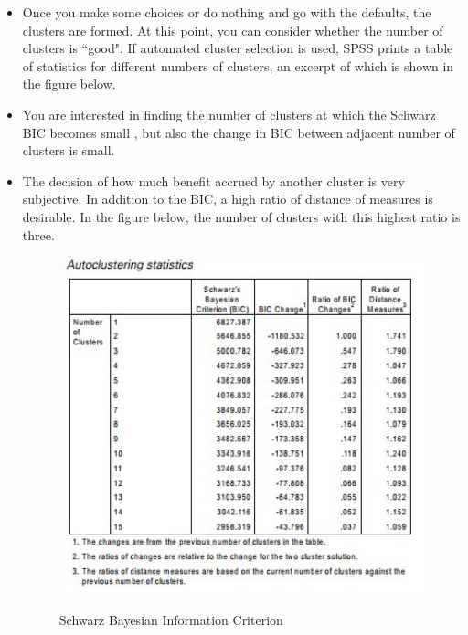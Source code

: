 \documentclass[a4paper,12pt]{article}
\begin{document}
\begin{itemize}
	\item Once you make some choices or do nothing and go with the defaults, the clusters are
	formed. At this point, you can consider whether the number of clusters is ``good". If
	automated cluster selection is used, SPSS prints a table of statistics for different
	numbers of clusters, an excerpt of which is shown in the figure below.
	\item  You are interested
	in finding the number of clusters at which the Schwarz BIC becomes small , but also the change in BIC between
	adjacent number of clusters is small. 
	
	\item The decision of how much benefit accrued by another cluster is very subjective. In addition to the BIC, a high ratio of distance of measures is desirable. In the figure below, the number of clusters with this highest ratio is three.
	
	\begin{figure}[h!]
		\begin{centering}
			\includegraphics[width=14.5cm]{images/TwoStep1.jpg}\\
			\caption{Schwarz Bayesian Information Criterion}
		\end{centering}
	\end{figure}
\end{itemize}
\end{document}
